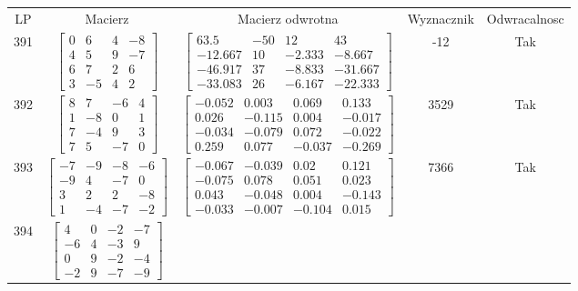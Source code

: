 \documentclass[a4paper,12pt]{article}
\begin{document}
\bgroup {} \vspace{0.2in} \begin{tabular}{c c c c c}
LP & Macierz & Macierz odwrotna & Wyznacznik & Odwracalnosc\\
391
&
$\begin{bmatrix} 0 & 6 & 4 & -8 \\ 4 & 5 & 9 & -7 \\ 6 & 7 & 2 & 6 \\ 3 & -5 & 4 & 2 \end{bmatrix}$
&
$\begin{bmatrix} 63.5 & -50 & 12 & 43 \\ -12.667 & 10 & -2.333 & -8.667 \\ -46.917 & 37 & -8.833 & -31.667 \\ -33.083 & 26 & -6.167 & -22.333 \end{bmatrix}$
&
-12
&
Tak
\\
392
&
$\begin{bmatrix} 8 & 7 & -6 & 4 \\ 1 & -8 & 0 & 1 \\ 7 & -4 & 9 & 3 \\ 7 & 5 & -7 & 0 \end{bmatrix}$
&
$\begin{bmatrix} -0.052 & 0.003 & 0.069 & 0.133 \\ 0.026 & -0.115 & 0.004 & -0.017 \\ -0.034 & -0.079 & 0.072 & -0.022 \\ 0.259 & 0.077 & -0.037 & -0.269 \end{bmatrix}$
&
3529
&
Tak
\\
393
&
$\begin{bmatrix} -7 & -9 & -8 & -6 \\ -9 & 4 & -7 & 0 \\ 3 & 2 & 2 & -8 \\ 1 & -4 & -7 & -2 \end{bmatrix}$
&
$\begin{bmatrix} -0.067 & -0.039 & 0.02 & 0.121 \\ -0.075 & 0.078 & 0.051 & 0.023 \\ 0.043 & -0.048 & 0.004 & -0.143 \\ -0.033 & -0.007 & -0.104 & 0.015 \end{bmatrix}$
&
7366
&
Tak
\\
394
&
$\begin{bmatrix} 4 & 0 & -2 & -7 \\ -6 & 4 & -3 & 9 \\ 0 & 9 & -2 & -4 \\ -2 & 9 & -7 & -9 \end{bmatrix}$

\end{tabular}
\end{document}
